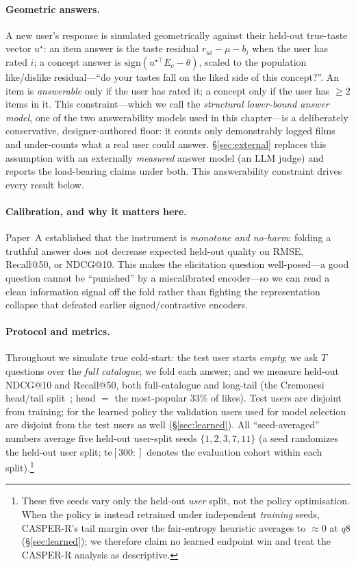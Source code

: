 \documentclass[11pt]{article}
\begin{document}
\paragraph{Geometric answers.} A new user's response is simulated geometrically against their held-out
true-taste vector $u^\star$: an item answer is the taste residual $r_{ui}-\mu-b_i$ when the user has
rated $i$; a concept answer is $\mathrm{sign}(u^{\star\top}E_c-\theta)$, scaled to the population
like/dislike residual---``do your tastes fall on the liked side of this concept?''. An item is
\emph{answerable} only if the user has rated it; a concept only if the user has $\ge 2$ items in it. This
constraint---which we call the \emph{structural lower-bound answer model}, one of the two answerability models
used in this chapter---is a deliberately conservative, designer-authored floor: it counts only demonstrably
logged films and under-counts what a real user could answer. \S\ref{sec:external} replaces this assumption with
an externally \emph{measured} answer model (an LLM judge) and reports the load-bearing claims under both. This
answerability constraint drives every result below.

\paragraph{Calibration, and why it matters here.} Paper~A established that the instrument is
\emph{monotone and no-harm}: folding a truthful answer does not decrease expected held-out quality on
RMSE, Recall@50, or NDCG@10. This makes the elicitation question well-posed---a good question cannot be
``punished'' by a miscalibrated encoder---so we can read a clean information signal off the fold rather
than fighting the representation collapse that defeated earlier signed/contrastive encoders.

\paragraph{Protocol and metrics.} Throughout we simulate true cold-start: the test user starts
\emph{empty}; we ask $T$ questions over the \emph{full catalogue}; we fold each answer; and we measure
held-out NDCG@10 and Recall@50, both full-catalogue and long-tail (the Cremonesi head/tail
split~\cite{cremonesi10}; head ${=}$ the most-popular $33\%$ of likes). Test users are disjoint from
training; for the learned policy the validation users used for model selection are disjoint from the
test users as well (\S\ref{sec:learned}). All ``seed-averaged'' numbers average five held-out user-split
seeds $\{1,2,3,7,11\}$ (a seed randomizes the held-out user split; te$[300{:}]$ denotes the evaluation
cohort within each split).\footnote{These five seeds vary only the held-out \emph{user} split, not the policy
optimisation. When the policy is instead retrained under independent \emph{training} seeds, CASPER-R's tail
margin over the fair-entropy heuristic averages to $\approx0$ at $q8$ (\S\ref{sec:learned}); we therefore
claim no learned endpoint win and treat the CASPER-R analysis as descriptive.}
\end{document}
